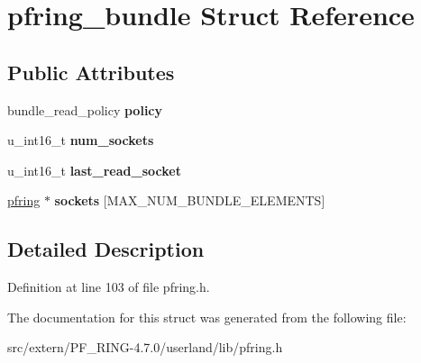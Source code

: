 \hypertarget{structpfring__bundle}{
\section{pfring\_\-bundle Struct Reference}
\label{structpfring__bundle}
}
\subsection*{Public Attributes}
\begin{DoxyCompactItemize}
\item 
\hypertarget{structpfring__bundle_a0bc0f024dabfc6ea18cbd8b2d7c7b375}{
bundle\_\-read\_\-policy {\bfseries policy}}
\label{structpfring__bundle_a0bc0f024dabfc6ea18cbd8b2d7c7b375}

\item 
\hypertarget{structpfring__bundle_a6a4d593409576ea4418fd28b812b41b5}{
u\_\-int16\_\-t {\bfseries num\_\-sockets}}
\label{structpfring__bundle_a6a4d593409576ea4418fd28b812b41b5}

\item 
\hypertarget{structpfring__bundle_a5d4dc122685699730bb9797c9d1a08d8}{
u\_\-int16\_\-t {\bfseries last\_\-read\_\-socket}}
\label{structpfring__bundle_a5d4dc122685699730bb9797c9d1a08d8}

\item 
\hypertarget{structpfring__bundle_a202c3d5821d46b2b0628c702cab68795}{
\hyperlink{struct____pfring}{pfring} $\ast$ {\bfseries sockets} \mbox{[}MAX\_\-NUM\_\-BUNDLE\_\-ELEMENTS\mbox{]}}
\label{structpfring__bundle_a202c3d5821d46b2b0628c702cab68795}

\end{DoxyCompactItemize}


\subsection{Detailed Description}


Definition at line 103 of file pfring.h.



The documentation for this struct was generated from the following file:\begin{DoxyCompactItemize}
\item 
src/extern/PF\_\-RING-\/4.7.0/userland/lib/pfring.h\end{DoxyCompactItemize}
